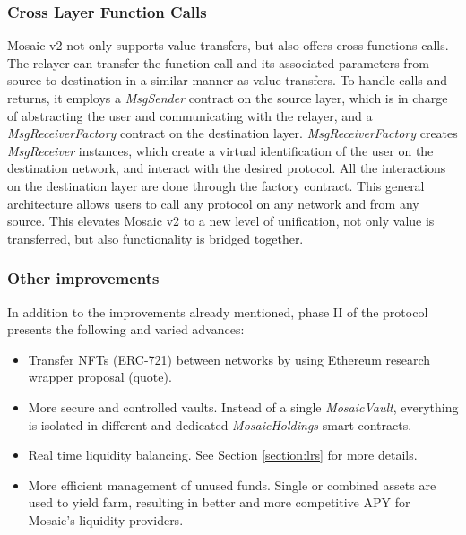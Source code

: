 \subsubsection*{Cross Layer Function Calls}
Mosaic v2 not only supports value transfers, but also offers cross functions calls. The relayer can transfer the function call and its associated parameters from source to destination in a similar manner as value transfers. To handle calls and returns, it employs a \textit{MsgSender} contract on the source layer, which is in charge of abstracting the user and communicating with the relayer, and a \textit{MsgReceiverFactory} contract on the destination layer. \textit{MsgReceiverFactory} creates \textit{MsgReceiver} instances, which create a virtual identification of the user on the destination network, and interact with the desired protocol. All the interactions on the destination layer are done through the factory contract. This general architecture allows users to call any protocol on any network and from any source. This elevates Mosaic v2 to a new level of unification, not only value is transferred, but also functionality is bridged together. 



\subsubsection*{Other improvements}
In addition to the improvements already mentioned, phase II of the protocol presents the following and varied advances:

\begin{itemize}
    \item Transfer NFTs (ERC-721) between networks by using Ethereum research wrapper proposal (quote).
    \item More secure and controlled vaults. Instead of a single \textit{MosaicVault}, everything is isolated in different and dedicated \textit{MosaicHoldings} smart contracts.
    \item Real time liquidity balancing. See Section \ref{section:lrs} for more details.
    \item More efficient management of unused funds. Single or combined assets are used to yield farm, resulting in better and more competitive APY for Mosaic's liquidity providers.
\end{itemize}
